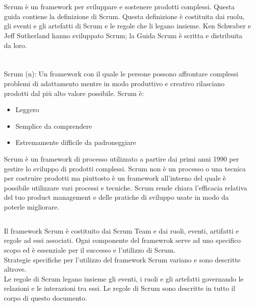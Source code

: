 
\section*{\color{Blue}{Scopo della Guida Scrum}}
\label{sec:purpose}
Scrum \`e un framework per sviluppare e sostenere prodotti complessi. Questa guida contiene la definizione di Scrum. Questa definizione \`e costituita dai ruolu, gli eventi e gli artefatti di Scrum e le regole che li legano insieme. Ken Schwaber e Jeff Sutherland hanno sviluppato Scrum; la Guida Scrum \`e scritta e distribuita da loro.

\section*{\color{Blue}{Overview di Scrum}}
\label{sec:overview}
Scrum (n): Un framework con il quale le persone possono affrontare complessi problemi di adattamento mentre in modo produttivo e creativo rilasciano prodotti dal pi\`u alto valore possibile. Scrum \`e:

\begin{itemize}
\item Leggero
\item Semplice da comprendere
\item Estremamente difficile da padroneggiare
\end{itemize}

Scrum \`e un framework di processo utilizzato a partire dai primi anni 1990 per gestire lo sviluppo di prodotti complessi. Scrum non \`e un processo o una tecnica per costruire prodotti ma piuttosto è un framework all'interno del quale \`e possibile utilizzare vari processi e tecniche. Scrum rende chiara l'efficacia relativa del tuo product management e delle pratiche di sviluppo usate in modo da poterle migliorare.

\subsection*{\color{SteelBlue}{Scrum Framework}}
\label{sec:framework}
Il framework Scrum \`e costituito dai Scrum Team e dai ruoli, eventi, artifatti e regole ad essi associati. Ogni componente del framewrok serve ad uno specifico scopo ed \`e essenziale per il successo e l'utilizzo di Scrum.
\newline
\\Strategie specifiche per l'utilizzo del framework Scrum variano e sono descritte altrove.
\newline
\\ Le regole di Scrum legano insieme gli eventi, i ruoli e gli artefatti governando le relazioni e le interazioni tra essi. Le regole di Scrum sono descritte in tutto il corpo di questo documento.
